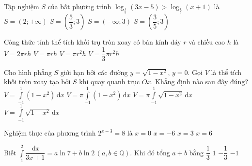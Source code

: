 \begin{ex}%
	Tập nghiệm $S$ của bất phương trình $\log_{\tfrac{1}{5}}(3x-5)>\log_{\tfrac{1}{5}}(x+1)$ là
	\choice
	{$S=(2;+\infty)$}
	{\True $S=\left(\dfrac{5}{3};3\right)$}
	{$S=(-\infty;3)$}
	{$S=\left(\dfrac{3}{5};3\right)$}
\end{ex}

\begin{ex}%
	Công thức tính thể tích khối trụ tròn xoay có bán kính đáy $r$ và chiều cao $h$ là
	\choice
	{$V=2\pi rh$}
	{$V=\pi rh$}
	{\True $V=\pi r^2h$}
	{$V=\dfrac{1}{3}\pi r^2h$}
\end{ex}

\begin{ex}%
	Cho hình phẳng $S$ giới hạn bởi các đường $y=\sqrt{1-x^2},\,y=0.$ Gọi $V$ là thể tích khối tròn xoay tạo bởi $S$ khi quay quanh trục $Ox$. Khẳng định nào sau đây đúng?
	\choice
	{$V=\displaystyle\int\limits_{-1}^1 (1-x^2)\mathrm{\,d}x$}
	{\True $V=\pi\displaystyle\int\limits_{-1}^1 (1-x^2)\mathrm{\,d}x$}
	{$V=\pi\displaystyle\int\limits_{-1}^1 \sqrt{1-x^2}\mathrm{\,d}x$}
	{$V=\displaystyle\int\limits_{-1}^1 \sqrt{1-x^2}\mathrm{\,d}x$}
\end{ex}

\begin{ex}%
	Nghiệm thực của phương trình $2^{x-3}=8$ là
	\choice
	{$x=0$}
	{$x=-6$}
	{$x=3$}
	{\True $x=6$}
\end{ex}

\begin{ex}%
	Biết $\displaystyle\int\limits_1^2 \dfrac{\mathrm{\,d}x}{3x+1}=a\ln 7+b\ln 2\,(a,b\in \mathbb{Q})$. Khi đó tổng $a+b$ bằng
	\choice
	{$\dfrac{1}{3}$}
	{$1$}
	{\True $-\dfrac{1}{3}$}
	{$-1$}
\end{ex}


